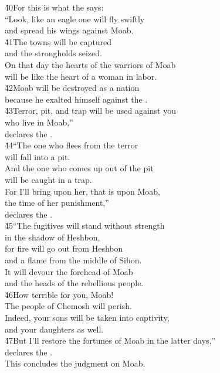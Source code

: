 \begin{poetry}
\poeml \v{40}For this is what the  says: \\
\poeml ``Look, like an eagle one will fly swiftly \\
\poemll    and spread his wings against Moab. \\
\poeml \v{41}The towns will be captured \\
\poemll    and the strongholds seized. \\
\poeml On that day the hearts of the warriors of Moab \\
\poemll    will be like the heart of a woman in labor. \\
\poeml \v{42}Moab will be destroyed as a nation \\
\poemll    because he exalted himself against the . \\
\poeml \v{43}Terror, pit, and trap will be used against you \\
\poemll    who live in Moab,'' \\
\poemlll       declares the . \\
\poeml \v{44}``The one who flees from the terror \\
\poemll    will fall into a pit. \\
\poeml And the one who comes up out of the pit \\
\poemll    will be caught in a trap. \\
\poeml For I'll bring upon her, that is upon Moab, \\
\poemll    the time of her punishment,'' \\
\poemlll       declares the . \\
\poeml \v{45}``The fugitives will stand without strength \\
\poemll    in the shadow of Heshbon, \\
\poeml for fire will go out from Heshbon \\
\poemll    and a flame from the middle of Sihon. \\
\poeml It will devour the forehead of Moab \\
\poemll    and the heads of the rebellious people. \\
\poeml \v{46}How terrible for you, Moab! \\
\poemll    The people of Chemosh will perish. \\
\poeml Indeed, your sons will be taken into captivity, \\
\poemll    and your daughters as well. \\
\poeml \v{47}But I'll restore the fortunes of Moab in the latter days,'' \\
\poemll    declares the . \\
\poeml This concludes the judgment on Moab.
\end{poetry}

